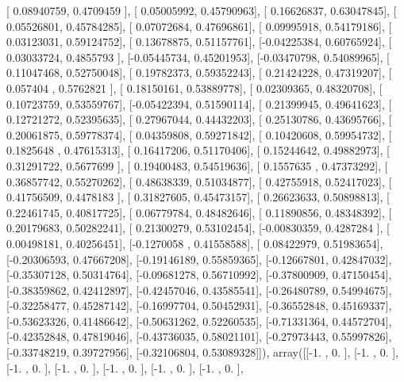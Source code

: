 \documentclass{article}
\begin{document}
       [ 0.08940759,  0.4709459 ],
       [ 0.05005992,  0.45790963],
       [ 0.16626837,  0.63047845],
       [ 0.05526801,  0.45784285],
       [ 0.07072684,  0.47696861],
       [ 0.09995918,  0.54179186],
       [ 0.03123031,  0.59124752],
       [ 0.13678875,  0.51157761],
       [-0.04225384,  0.60765924],
       [ 0.03033724,  0.4855793 ],
       [-0.05445734,  0.45201953],
       [-0.03470798,  0.54089965],
       [ 0.11047468,  0.52750048],
       [ 0.19782373,  0.59352243],
       [ 0.21424228,  0.47319207],
       [ 0.057404  ,  0.5762821 ],
       [ 0.18150161,  0.53889778],
       [ 0.02309365,  0.48320708],
       [ 0.10723759,  0.53559767],
       [-0.05422394,  0.51590114],
       [ 0.21399945,  0.49641623],
       [ 0.12721272,  0.52395635],
       [ 0.27967044,  0.44432203],
       [ 0.25130786,  0.43695766],
       [ 0.20061875,  0.59778374],
       [ 0.04359808,  0.59271842],
       [ 0.10420608,  0.59954732],
       [ 0.1825648 ,  0.47615313],
       [ 0.16417206,  0.51170406],
       [ 0.15244642,  0.49882973],
       [ 0.31291722,  0.5677699 ],
       [ 0.19400483,  0.54519636],
       [ 0.1557635 ,  0.47373292],
       [ 0.36857742,  0.55270262],
       [ 0.48638339,  0.51034877],
       [ 0.42755918,  0.52417023],
       [ 0.41756509,  0.4478183 ],
       [ 0.31827605,  0.45473157],
       [ 0.26623633,  0.50898813],
       [ 0.22461745,  0.40817725],
       [ 0.06779784,  0.48482646],
       [ 0.11890856,  0.48348392],
       [ 0.20179683,  0.50282241],
       [ 0.21300279,  0.53102454],
       [-0.00830359,  0.4287284 ],
       [ 0.00498181,  0.40256451],
       [-0.1270058 ,  0.41558588],
       [ 0.08422979,  0.51983654],
       [-0.20306593,  0.47667208],
       [-0.19146189,  0.55859365],
       [-0.12667801,  0.42847032],
       [-0.35307128,  0.50314764],
       [-0.09681278,  0.56710992],
       [-0.37800909,  0.47150454],
       [-0.38359862,  0.42412897],
       [-0.42457046,  0.43585541],
       [-0.26480789,  0.54994675],
       [-0.32258477,  0.45287142],
       [-0.16997704,  0.50452931],
       [-0.36552848,  0.45169337],
       [-0.53623326,  0.41486642],
       [-0.50631262,  0.52260535],
       [-0.71331364,  0.44572704],
       [-0.42352848,  0.47819046],
       [-0.43736035,  0.58021101],
       [-0.27973443,  0.55997826],
       [-0.33748219,  0.39727956],
       [-0.32106804,  0.53089328]]), array([[-1.        ,  0.        ],
       [-1.        ,  0.        ],
       [-1.        ,  0.        ],
       [-1.        ,  0.        ],
       [-1.        ,  0.        ],
       [-1.        ,  0.        ],
       [-1.        ,  0.        ],
\end{document}

